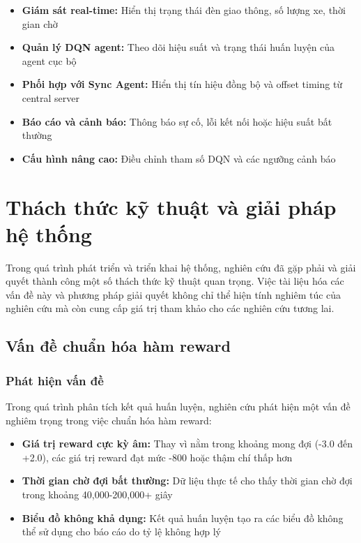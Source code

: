 \begin{itemize}
    \item \textbf{Giám sát real-time:} Hiển thị trạng thái đèn giao thông, số lượng xe, thời gian chờ
    \item \textbf{Quản lý DQN agent:} Theo dõi hiệu suất và trạng thái huấn luyện của agent cục bộ
    \item \textbf{Phối hợp với Sync Agent:} Hiển thị tín hiệu đồng bộ và offset timing từ central server  
    \item \textbf{Báo cáo và cảnh báo:} Thông báo sự cố, lỗi kết nối hoặc hiệu suất bất thường
    \item \textbf{Cấu hình nâng cao:} Điều chỉnh tham số DQN và các ngưỡng cảnh báo
\end{itemize}

\section{Thách thức kỹ thuật và giải pháp hệ thống}

Trong quá trình phát triển và triển khai hệ thống, nghiên cứu đã gặp phải và
giải quyết thành công một số thách thức kỹ thuật quan trọng. Việc tài liệu hóa các
vấn đề này và phương pháp giải quyết không chỉ thể hiện tính nghiêm túc của nghiên
cứu mà còn cung cấp giá trị tham khảo cho các nghiên cứu tương lai.

\subsection{Vấn đề chuẩn hóa hàm reward}

\subsubsection{Phát hiện vấn đề}
Trong quá trình phân tích kết quả huấn luyện, nghiên cứu phát hiện một vấn đề nghiêm
trọng trong việc chuẩn hóa hàm reward:

\begin{itemize}
    \item \textbf{Giá trị reward cực kỳ âm:} Thay vì nằm trong khoảng mong đợi (-3.0
        đến +2.0), các giá trị reward đạt mức -800 hoặc thậm chí thấp hơn

    \item \textbf{Thời gian chờ đợi bất thường:} Dữ liệu thực tế cho thấy thời
        gian chờ đợi trong khoảng 40,000-200,000+ giây

    \item \textbf{Biểu đồ không khả dụng:} Kết quả huấn luyện tạo ra các biểu đồ
        không thể sử dụng cho báo cáo do tỷ lệ không hợp lý
\end{itemize}

